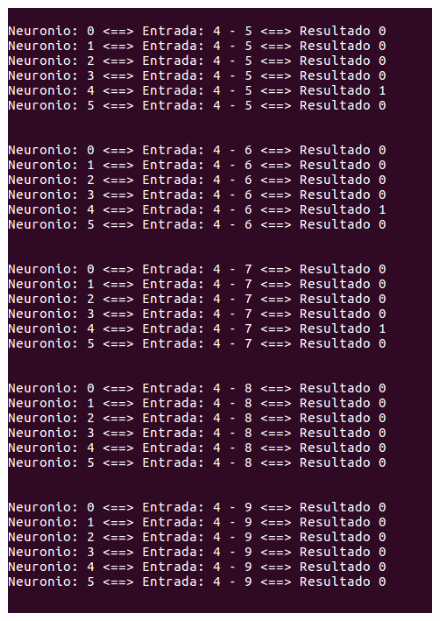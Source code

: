 \documentclass[hidelinks,12pt]{article}
\begin{document}
		\begin{figure}[!h]
			\centering
			\includegraphics[scale=0.5]{Figures/E3S4P2R.png}
		\end{figure}
		
\end{document}
